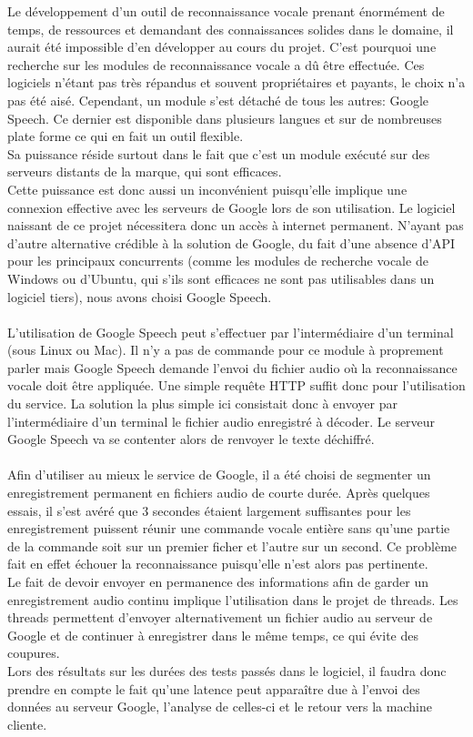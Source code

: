 \documentclass[a4paper, 11pt]{report}
\begin{document}
	Le développement d'un outil de reconnaissance vocale prenant énormément de temps, de ressources et demandant des connaissances solides dans le domaine, il aurait été impossible d'en développer au cours du projet. C'est pourquoi une recherche sur les modules de reconnaissance vocale a dû être effectuée. Ces logiciels n'étant pas très répandus et souvent propriétaires et payants, le choix n'a pas été aisé. Cependant, un module s'est détaché de tous les autres: Google Speech. Ce dernier est disponible dans plusieurs langues et sur de nombreuses plate forme ce qui en fait un outil flexible.\\
	Sa puissance réside surtout dans le fait que c'est un module exécuté sur des serveurs distants de la marque, qui sont efficaces.\\
	Cette puissance est donc aussi un inconvénient puisqu'elle implique une connexion effective avec les serveurs de Google lors de son utilisation. Le logiciel naissant de ce projet nécessitera donc un accès à internet permanent. N'ayant pas d'autre alternative crédible à la solution de Google, du fait d'une absence d'API pour les principaux concurrents (comme les modules de recherche vocale de Windows ou d'Ubuntu, qui s'ils sont efficaces ne sont pas utilisables dans un logiciel tiers), nous avons choisi Google Speech.\\ \ \\
	L'utilisation de Google Speech peut s'effectuer par l'intermédiaire d'un terminal (sous Linux ou Mac). Il n'y a pas de commande pour ce module à proprement parler mais Google Speech demande l'envoi du fichier audio où la reconnaissance vocale doit être appliquée. Une simple requête HTTP suffit donc pour l'utilisation du service. La solution la plus simple ici consistait donc à envoyer par l'intermédiaire d'un terminal le fichier audio enregistré à décoder. Le serveur Google Speech va se contenter alors de renvoyer le texte déchiffré.\\ \ \\
	Afin d'utiliser au mieux le service de Google, il a été choisi de segmenter un enregistrement permanent en fichiers audio de courte durée. Après quelques essais, il s'est avéré que 3 secondes étaient largement suffisantes pour les enregistrement puissent réunir une commande vocale entière sans qu'une partie de la commande soit sur un premier ficher et l'autre sur un second. Ce problème fait en effet échouer la reconnaissance puisqu'elle n'est alors pas pertinente.\\
	Le fait de devoir envoyer en permanence des informations afin de garder un enregistrement audio continu implique l'utilisation dans le projet de threads. Les threads permettent d'envoyer alternativement un fichier audio au serveur de Google et de continuer à enregistrer dans le même temps, ce qui évite des coupures.\\
	Lors des résultats sur les durées des tests passés dans le logiciel, il faudra donc prendre en compte le fait qu'une latence peut apparaître due à l'envoi des données au serveur Google, l'analyse de celles-ci et le retour vers la machine cliente.
	
\end{document}
